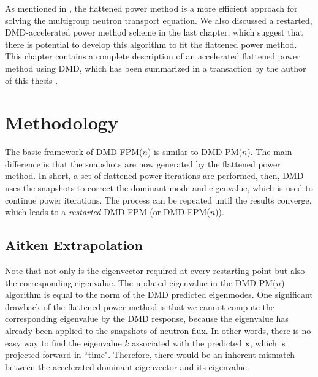 As mentioned in , the flattened power method is a more efficient approach for solving the multigroup neutron transport equation.
We also discussed a restarted, DMD-accelerated power method scheme in the last chapter, which suggest that there is potential to develop this algorithm to fit the flattened power method.
This chapter contains a complete description of an accelerated flattened power method using DMD, which has been summarized in a transaction by the author of this thesis \cite{xu_acceleration}. 

\section{Methodology}
The basic framework of DMD-FPM($n$) is similar to DMD-PM($n$). The main difference is that the snapshots are now generated by the flattened power method.
In short, a set of flattened power iterations are performed, then, DMD uses the snapshots to correct the dominant mode and eigenvalue, which is used to continue power iterations.
The process can be repeated until the results converge, which leads to a {\it restarted} DMD-FPM (or DMD-FPM($n$)).

\subsection{Aitken Extrapolation}
Note that not only is the eigenvector required at every restarting point but also the corresponding eigenvalue.
The updated eigenvalue in the DMD-PM($n$) algorithm is equal to the norm of the DMD predicted eigenmodes. 
One significant drawback of the flattened power method is that we cannot compute the corresponding eigenvalue by the DMD response, because the eigenvalue has already been applied to the snapshots of neutron flux.
In other words, there is no easy way to find the eigenvalue $k$ associated with the predicted $\mathbf{x}$, which is projected forward in ``time".
Therefore, there would be an inherent mismatch between the accelerated dominant eigenvector and its eigenvalue.

